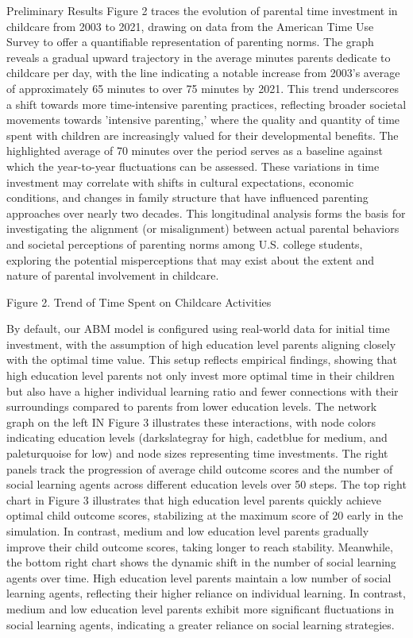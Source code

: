 Preliminary Results
Figure 2 traces the evolution of parental time investment in childcare from 2003 to 2021, drawing on data from the American Time Use Survey to offer a quantifiable representation of parenting norms. The graph reveals a gradual upward trajectory in the average minutes parents dedicate to childcare per day, with the line indicating a notable increase from 2003's average of approximately 65 minutes to over 75 minutes by 2021. This trend underscores a shift towards more time-intensive parenting practices, reflecting broader societal movements towards 'intensive parenting,' where the quality and quantity of time spent with children are increasingly valued for their developmental benefits. The highlighted average of 70 minutes over the period serves as a baseline against which the year-to-year fluctuations can be assessed. These variations in time investment may correlate with shifts in cultural expectations, economic conditions, and changes in family structure that have influenced parenting approaches over nearly two decades. This longitudinal analysis forms the basis for investigating the alignment (or misalignment) between actual parental behaviors and societal perceptions of parenting norms among U.S. college students, exploring the potential misperceptions that may exist about the extent and nature of parental involvement in childcare. 
 
Figure 2. Trend of Time Spent on Childcare Activities

By default, our ABM model is configured using real-world data for initial time investment, with the assumption of high education level parents aligning closely with the optimal time value. This setup reflects empirical findings, showing that high education level parents not only invest more optimal time in their children but also have a higher individual learning ratio and fewer connections with their surroundings compared to parents from lower education levels. The network graph on the left IN Figure 3 illustrates these interactions, with node colors indicating education levels (darkslategray for high, cadetblue for medium, and paleturquoise for low) and node sizes representing time investments. The right panels track the progression of average child outcome scores and the number of social learning agents across different education levels over 50 steps.
The top right chart in Figure 3 illustrates that high education level parents quickly achieve optimal child outcome scores, stabilizing at the maximum score of 20 early in the simulation. In contrast, medium and low education level parents gradually improve their child outcome scores, taking longer to reach stability. Meanwhile, the bottom right chart shows the dynamic shift in the number of social learning agents over time. High education level parents maintain a low number of social learning agents, reflecting their higher reliance on individual learning. In contrast, medium and low education level parents exhibit more significant fluctuations in social learning agents, indicating a greater reliance on social learning strategies.
 
